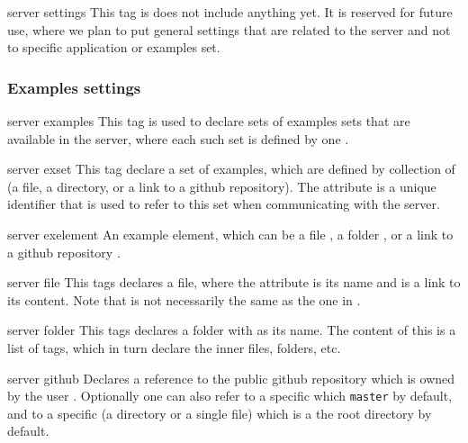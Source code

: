 \bigskip
\xmlstruct
{server}
{settings}
{%
%
  This tag is does not include anything yet. It is reserved for future
  use, where we plan to put general settings that are related to the
  server and not to specific application or examples set.
%
}

\subsubsection*{Examples settings}

\bigskip
\xmlstruct
{server}
{examples}
{%
%
  This tag is used to declare sets of examples sets that are available
  in the server, where each such set is defined by one
  .
%
}


\bigskip
\xmlstruct
{server}
{exset}
{%
%
  This tag declare a set of examples, which are defined by collection
  of  (a file, a directory, or a link to a
  github repository).
%
  The attribute  is a unique identifier that is used
  to refer to this set when communicating with the server.
%
}


\bigskip
\xmlstruct
{server}
{exelement}
{%
%
  An example element, which can be a file , a
  folder , or a link to a github repository
  .
%
}



\bigskip
\xmlstruct
{server}
{file}
{%
%
  This tags declares a file, where the  attribute
  is its name and  is a link to its content. Note
  that  is not necessarily the same as the one in
  .
%
}


\bigskip
\xmlstruct
{server}
{folder}
{%
%
  This tags declares a folder with  as its
  name. The content of this is a list of 
  tags, which in turn declare the inner files, folders, etc.
%
}



\bigskip
\xmlstruct
{server}
{github}
{%
%
  Declares a reference to the public github repository
   which is owned by the user
  . Optionally one can also refer to a specific
   which \texttt{master} by default, and to a
  specific  (a directory or a single file) which
  is a the root directory by default.
%
}


